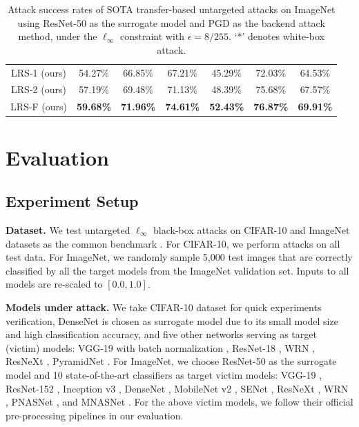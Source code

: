 \documentclass[letterpaper]{article} %
\theoremstyle{plain}
\theoremstyle{definition}
\begin{document}
\begin{table}[ht!]
\begin{center}
{\begin{tabular}{ccccccc}
LRS-1 (ours)   & 54.27\% & 66.85\% & 67.21\% & 45.29\% & 72.03\% & {64.53\%} \\
LRS-2 (ours)   & 57.19\% & 69.48\% & 71.13\% & 48.39\% & 75.68\% & {67.57\%} \\
LRS-F (ours) &  \textbf{59.68\%}  & \textbf{71.96\%}& \textbf{74.61\%} & \textbf{52.43\%} & \textbf{76.87\%}  & {\textbf{69.91\%}}  \\
\bottomrule
\end{tabular}
}
\caption{Attack success rates of SOTA transfer-based untargeted attacks on ImageNet using ResNet-50 as the surrogate model and PGD as the backend attack method, under the $\ell_\infty$ constraint with $\epsilon=8/255$. `*' denotes white-box attack.}
\label{tab:comapre_imagenet}
\end{center}
\end{table}

\section{Evaluation} \label{sec:experiments}

\subsection{Experiment Setup}
{\bf Dataset.} We test untargeted $\ell_{\infty}$ black-box attacks on CIFAR-10 \cite{krizhevsky2009learning} and ImageNet \cite{russakovsky2015imagenet} datasets as the common benchmark \cite{dong2018boosting,dong2019evading,guo2020backpropagating,li2023making}. For CIFAR-10, we perform attacks on all test data. For ImageNet, we randomly sample 5,000 test images that are correctly classified by all the target models from the ImageNet validation set. Inputs to all models are re-scaled to $[0.0,1.0]$.

\textbf{Models under attack.} We take CIFAR-10 dataset for quick experiments verification, DenseNet \cite{Huang2017densely} is chosen as surrogate model due to its small model size and high classification accuracy, and five other networks serving as target (victim) models: VGG-19 with batch normalization \cite{Simonyan2015}, ResNet-18 \cite{He2016}, WRN \cite{Zagoruyko2016}, ResNeXt \cite{Xie2017aggregated}, PyramidNet  \cite{Han2017}.
For ImageNet, we choose ResNet-50 \cite{He2016} as the surrogate model and 10 state-of-the-art classifiers as target victim models: VGG-19 \cite{Simonyan2015}, ResNet-152 \cite{He2016}, Inception v3 \cite{Szegedy2016}, DenseNet \cite{Huang2017densely}, MobileNet v2 \cite{Sandler2018mobilenetv2}, SENet \cite{Hu2018}, ResNeXt \cite{Xie2017aggregated}, WRN \cite{Zagoruyko2016}, PNASNet \cite{Liu2018}, and MNASNet \cite{Tan2019mnasnet}. For the above victim models, we follow their official pre-processing pipelines in our evaluation.
\end{document}
